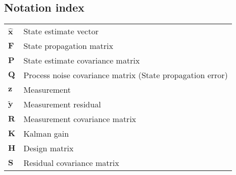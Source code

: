 \documentclass[12pt]{article}
\begin{document}
\newpage
\begin{appendices}

\section{Notation index}
\begin{tabular}{ll}
$\hat{\mathbf{x}}$   & State estimate vector \\
$\mathbf{F}$         & State propagation matrix \\
$\mathbf{P}$         & State estimate covariance matrix \\
$\mathbf{Q}$         & Process noise covariance matrix (State propagation error) \\
$\mathbf{z}$         & Measurement \\
$\tilde{\mathbf{y}}$ & Measurement residual \\
$\mathbf{R}$         & Measurement covariance matrix \\
$\mathbf{K}$         & Kalman gain \\
$\mathbf{H}$         & Design matrix \\
$\mathbf{S}$         & Residual covariance matrix \\
\end{tabular}

\end{appendices}
\end{document}
